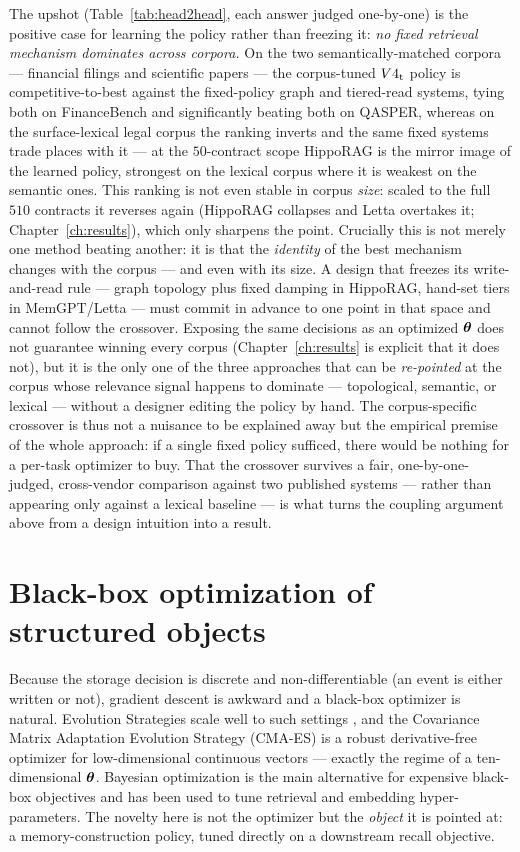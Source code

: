 The upshot (Table~\ref{tab:head2head}, each answer judged one-by-one) is the
positive case for learning the policy rather than freezing it: \emph{no fixed
retrieval mechanism dominates across corpora.} On the two semantically-matched
corpora --- financial filings and scientific papers --- the corpus-tuned $V4\textsubscript{t}{}$
policy is competitive-to-best against the fixed-policy graph and tiered-read
systems, tying both on FinanceBench and significantly beating both on QASPER,
whereas on the surface-lexical legal corpus the ranking inverts and the same
fixed systems trade places with it --- at the $50$-contract scope HippoRAG is the
mirror image of the learned policy, strongest on the lexical corpus where it is
weakest on the semantic ones. This ranking is not even stable in corpus
\emph{size}: scaled to the full $510$ contracts it reverses again (HippoRAG
collapses and Letta overtakes it; Chapter~\ref{ch:results}), which only sharpens
the point. Crucially this is not merely one method beating another: it is
that the \emph{identity} of the best mechanism changes with the corpus --- and
even with its size. A design
that freezes its write-and-read rule --- graph topology plus fixed damping in
HippoRAG, hand-set tiers in MemGPT/Letta --- must commit in advance to one point
in that space and cannot follow the crossover. Exposing the same decisions as an
optimized $\boldsymbol{\theta}$ does not guarantee winning every corpus (Chapter~\ref{ch:results}
is explicit that it does not), but it is the only one of the three approaches
that can be \emph{re-pointed} at the corpus whose relevance signal happens to
dominate --- topological, semantic, or lexical --- without a designer editing the
policy by hand. The corpus-specific crossover is thus not a nuisance to be
explained away but the empirical premise of the whole approach: if a single
fixed policy sufficed, there would be nothing for a per-task optimizer to buy.
That the crossover survives a fair, one-by-one-judged, cross-vendor comparison
against two published systems --- rather than appearing only against a lexical
baseline --- is what turns the coupling argument above from a design intuition
into a result.

\section{Black-box optimization of structured objects}
Because the storage decision is discrete and non-differentiable (an event is
either written or not), gradient descent is awkward and a black-box optimizer is
natural. Evolution Strategies scale well to such settings
\citep{salimans2017es}, and the Covariance Matrix Adaptation Evolution Strategy
(CMA-ES) \citep{hansen2016cmaes} is a robust derivative-free optimizer for
low-dimensional continuous vectors --- exactly the regime of a ten-dimensional
$\boldsymbol{\theta}$. Bayesian optimization \citep{snoek2012bayesopt} is the main
alternative for expensive black-box objectives and has been used to tune
retrieval and embedding hyper-parameters. The novelty here is not the optimizer
but the \emph{object} it is pointed at: a memory-construction policy, tuned
directly on a downstream recall objective.

